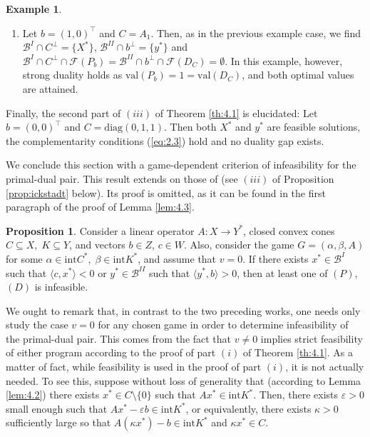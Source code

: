 \documentclass[11pt, twoside]{article}
\numberwithin{equation}{section}
\theoremstyle{definition}
\newtheorem{example}{Example}[section]
\newtheorem{proposition}{Proposition}[section]
\begin{document}
\begin{example}
\begin{enumerate}
\item Let $b=(1,0)^\top$ and $C=A_1$. Then, as in the previous example case, we find $\mathcal{B}^{I}\cap C^{\perp}=\{X^*\}$, $\mathcal{B}^{II}\cap b^{\perp}=\{y^*\}$ and $\mathcal{B}^{I}\cap C^{\perp}\cap\mathcal{F}(P_b)=\mathcal{B}^{II}\cap b^{\perp}\cap\mathcal{F}(D_C)=\emptyset$. In this example, however, strong duality holds as $\text{val}(P_b)=1=\text{val}(D_C)$, and both optimal values are attained.
\end{enumerate}
\vspace{-0.2cm}

Finally, the second part of $(iii)$ of Theorem \ref{th:4.1} is elucidated: Let $b=(0,0)^\top$ and $C=\text{diag}(0,1,1)$. Then both $X^*$ and $y^*$ are feasible solutions, the complementarity conditions (\ref{eq:2.3}) hold and no duality gap exists.\vspace{0.5cm}
\end{example}

We conclude this section with a game-dependent criterion of infeasibility for the primal-dual pair. This result extends on those of \cite{dantzig1951proof, ickstadt2024semidefinite} (see $(iii)$ of Proposition \ref{prop:ickstadt} below). Its proof is omitted, as it can be found in the first paragraph of the proof of Lemma \ref{lem:4.3}.\vspace{0.2cm}\par

\begin{proposition}\label{prop:infeasibility}
    Consider a linear operator $A:X\rightarrow Y^*$, closed convex cones $C\subseteq X,\;K\subseteq Y$, and vectors $b\in Z$, $c\in W$. Also, consider the game $G=(\alpha,\beta,A)$ for some $\alpha\in\text{int} C^*,\;\beta\in\text{int}K^*$, and assume that $v=0$. If there exists $x^*\in\mathcal{B}^{I}$ such that $\langle c,x^*\rangle<0$ or $y^*\in\mathcal{B}^{II}$ such that $\langle y^*,b\rangle>0$, then at least one of $(P)$, $(D)$ is infeasible.
\end{proposition}

We ought to remark that, in contrast to the two preceding works, one needs only study the case $v=0$ for any chosen game in order to determine infeasibility of the primal-dual pair. This comes from the fact that $v\neq0$ implies strict feasibility of either program according to the proof of part $(i)$ of Theorem \ref{th:4.1}. As a matter of fact, while feasibility is used in the proof of part $(i)$, it is not actually needed. To see this, suppose without loss of generality that (according to Lemma \ref{lem:4.2}) there exists $x^*\in C\setminus\{0\}$ such that $Ax^*\in\text{int}K^*$. Then, there exists $\varepsilon>0$ small enough such that $Ax^*-\varepsilon b\in\text{int}K^*$, or equivalently, there exists $\kappa>0$ sufficiently large so that $A(\kappa x^*)-b\in \text{int}K^*$ and $\kappa x^*\in C$.
\end{document}
